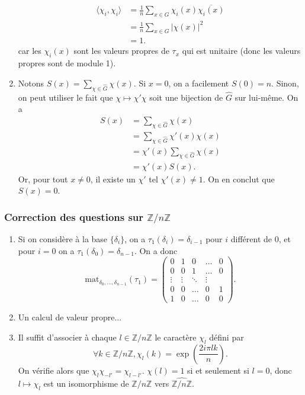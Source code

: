 \documentclass{article}[a4paper]
\newcommand{\Z}{\mathbb{Z}}
\newcommand{\braket}[2]{\langle #1,#2\rangle}
\begin{document}
\begin{enumerate}
    \begin{align*}
        \braket{\chi_i}{\chi_i} &= \frac{1}{n}\sum_{x\in G} \chi_i(x)\overline{\chi_i(x)}\\
        &= \frac{1}{n}\sum_{x\in G} \lvert\chi(x)\rvert^2\\
        &= 1.
    \end{align*}
    car les \(\chi_i(x)\) sont les valeurs propres de \(\tau_x\) qui est unitaire (donc les
    valeurs propres sont de module 1).
    \item Notons \(S(x) = \sum_{\chi\in \widehat{G}}\chi(x)\). Si \(x = 0\), on a facilement
    \(S(0) = n\). Sinon, on peut utiliser le fait que \(\chi \mapsto \chi' \chi\) soit 
    une bijection de \(\widehat{G}\) sur lui-même. On a
    \begin{align*}
        S(x) &=  \sum_{\chi\in \widehat{G}}\chi(x)\\
        &= \sum_{\chi\in \widehat{G}}\chi'(x)\chi(x)\\
        &= \chi'(x)\sum_{\chi\in \widehat{G}}\chi(x)\\
        & = \chi'(x)S(x).
    \end{align*}
    Or, pour tout \(x\neq 0\), il existe un \(\chi'\) tel \(\chi'(x) \neq 1\). On en conclut 
    que \(S(x) = 0\).
\end{enumerate}
\subsubsection*{Correction des questions sur \(\Z/n\Z\)}
\begin{enumerate}
    \item Si on considère à la base \(\{\delta_i\}\), on a \(\tau_1(\delta_i) = \delta_{i-1}\) pour \(i\) 
    différent de \(0\), et pour \(i=0\) on a \(\tau_1(\delta_{0}) = \delta_{n-1}\). On a donc
    \begin{equation*}
        \mathrm{mat}_{\delta_0,\dots,\delta_{n-1}}(\tau_1) = \begin{pmatrix}
            0 & 1 & 0 & \dots & 0\\
            0 & 0 & 1 & \dots & 0\\
            \vdots & \vdots & \ddots & \vdots\\
            0 & 0 & \dots & 0 & 1\\
            1 & 0 & \dots & 0 & 0
        \end{pmatrix}.
    \end{equation*}
    \item Un calcul de valeur propre...
    \item Il suffit d'associer à chaque \(l\in \Z/n\Z\) le caractère \(\chi_l\) défini par
    \begin{equation*}
        \forall k\in \Z/n\Z, \chi_l(k) = \exp\left(\frac{2i\pi lk}{n}\right).
    \end{equation*}
    On vérifie alors que \(\chi_l\chi_{-l'} = \chi_{l-l'}\). \(\chi(l) = 1\) si et seulement 
    si \(l=0\), donc \(l\mapsto \chi_l\) est un isomorphisme de \(\Z/n\Z\) vers \(\widehat{\Z/n\Z}\).
\end{enumerate}
\end{document}
